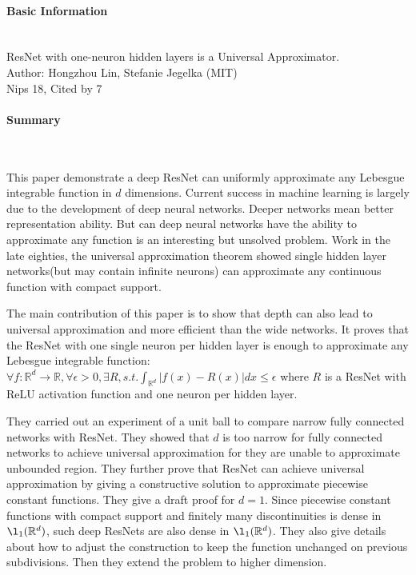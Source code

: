 \documentclass{article}
\begin{document}
\thispagestyle{empty}

\paragraph{Basic Information}  \ \\
ResNet with one-neuron hidden layers is a Universal Approximator. \\
Author: Hongzhou Lin, Stefanie Jegelka (MIT) \\
Nips 18, Cited by 7

\paragraph{Summary}  \  

This paper demonstrate a deep ResNet can uniformly approximate any Lebesgue integrable function in $d$ dimensions. Current success in machine learning is largely due to the development of deep neural networks. Deeper networks mean better representation ability. But can deep neural networks have the ability to approximate any function is an interesting but unsolved problem. Work in the late eighties, the universal approximation theorem showed single hidden layer networks(but may contain infinite neurons) can approximate any continuous function with compact support. 

The main contribution of this paper is to show that depth can also lead to universal approximation and more efficient than the wide networks. It proves that the ResNet with one single neuron per hidden layer is enough to approximate any Lebesgue integrable function: $\forall f: \mathbb{R}^d \rightarrow \mathbb{R}, \forall \epsilon > 0, \exists R, s.t. \int_{\mathbb{R}^d} |f(x) - R(x)| dx \leq \epsilon$ where $R$ is a ResNet with ReLU activation function and one neuron per hidden layer.

They carried out an experiment of a unit ball to compare narrow fully connected networks with ResNet. They showed that $d$ is too narrow for fully connected networks to achieve universal approximation for they are unable to approximate unbounded region. They further prove that ResNet can achieve universal approximation by giving a constructive solution to approximate piecewise constant functions. They give a draft proof for $d=1$. Since piecewise constant functions with compact support and finitely many discontinuities is dense in $\l_1(\mathbb{R}^d)$, such deep ResNets are also dense in $\l_1(\mathbb{R}^d)$. They also give details about how to adjust the construction to keep the function unchanged on previous subdivisions. Then they extend the problem to higher dimension.
\end{document}
